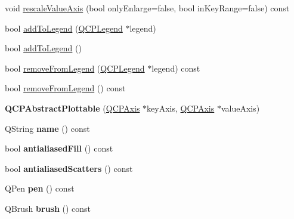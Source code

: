 \begin{DoxyCompactItemize}
\item 
void \hyperlink{class_q_c_p_abstract_plottable_a714eaf36b12434cd71846215504db82e}{rescale\+Value\+Axis} (bool only\+Enlarge=false, bool in\+Key\+Range=false) const
\item 
bool \hyperlink{class_q_c_p_abstract_plottable_aa64e93cb5b606d8110d2cc0a349bb30f}{add\+To\+Legend} (\hyperlink{class_q_c_p_legend}{Q\+C\+P\+Legend} $\ast$legend)
\item 
bool \hyperlink{class_q_c_p_abstract_plottable_a70f8cabfd808f7d5204b9f18c45c13f5}{add\+To\+Legend} ()
\item 
bool \hyperlink{class_q_c_p_abstract_plottable_a3cc235007e2343a65ad4f463767e0e20}{remove\+From\+Legend} (\hyperlink{class_q_c_p_legend}{Q\+C\+P\+Legend} $\ast$legend) const
\item 
bool \hyperlink{class_q_c_p_abstract_plottable_ac95fb2604d9106d0852ad9ceb326fe8c}{remove\+From\+Legend} () const
\item 
\mbox{\label{class_q_c_p_abstract_plottable_af78a036e40db6f53a31abadc5323715a}} 
{\bfseries Q\+C\+P\+Abstract\+Plottable} (\hyperlink{class_q_c_p_axis}{Q\+C\+P\+Axis} $\ast$key\+Axis, \hyperlink{class_q_c_p_axis}{Q\+C\+P\+Axis} $\ast$value\+Axis)
\item 
\mbox{\label{class_q_c_p_abstract_plottable_a52c226eefcb1920240eeabae574d28c0}} 
Q\+String {\bfseries name} () const
\item 
\mbox{\label{class_q_c_p_abstract_plottable_a022717896dc57b638a7b5a7be7212ba9}} 
bool {\bfseries antialiased\+Fill} () const
\item 
\mbox{\label{class_q_c_p_abstract_plottable_a795370db6b1309de0ab60b633efb5ec2}} 
bool {\bfseries antialiased\+Scatters} () const
\item 
\mbox{\label{class_q_c_p_abstract_plottable_ad5972efc31344e5a7a78ab4f8864b2d3}} 
Q\+Pen {\bfseries pen} () const
\item 
\mbox{\label{class_q_c_p_abstract_plottable_a893b4896dfd92b68b05b2600b80f5826}} 
Q\+Brush {\bfseries brush} () const
\item 
\mbox{\label{class_q_c_p_abstract_plottable_a2cdd6f0dd5e9a979037f86b4000d9cfe}} 

\end{DoxyCompactItemize}
